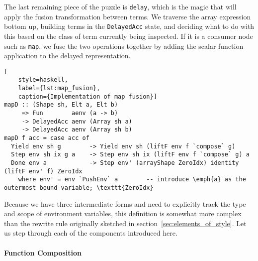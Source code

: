 The last remaining piece of the puzzle is \texttt{delay}, which is the magic
that will apply the fusion transformation between terms. We traverse the array
expression bottom up, building terms in the \texttt{DelayedAcc} state, and
deciding what to do with this based on the class of term currently being
inspected. If it is a consumer node such as \texttt{map}, we fuse the two
operations together by adding the scalar function application to the delayed
representation.
%
\begin{lstlisting}[
    style=haskell,
    label={lst:map_fusion},
    caption={Implementation of map fusion}]
mapD :: (Shape sh, Elt a, Elt b)
     => Fun        aenv (a -> b)
     -> DelayedAcc aenv (Array sh a)
     -> DelayedAcc aenv (Array sh b)
mapD f acc = case acc of
  Yield env sh g        -> Yield env sh (liftF env f `compose` g)
  Step env sh ix g a    -> Step env sh ix (liftF env f `compose` g) a
  Done env a            -> Step env' (arrayShape ZeroIdx) identity (liftF env' f) ZeroIdx
    where env' = env `PushEnv` a        -- introduce \emph{a} as the outermost bound variable; \texttt{ZeroIdx}
\end{lstlisting}
%
Because we have three intermediate forms and need to explicitly track the type
and scope of environment variables, this definition is somewhat more complex
than the rewrite rule originally sketched in
section~\ref{sec:elements_of_style}. Let us step through each of the components
introduced here.


\paragraph{Function Composition}

